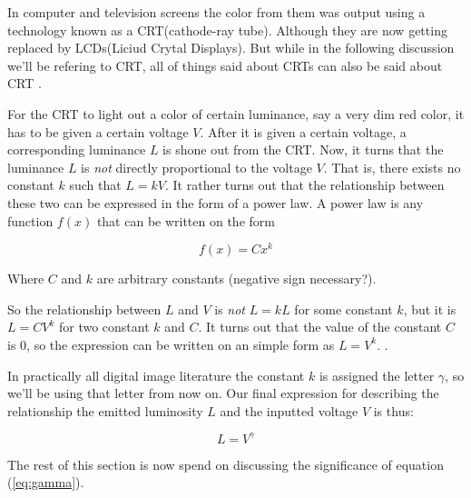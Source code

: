 \cite{lilley:_not_just_decor}

\cite{motta1991analytical_crt}

\cite{poynton2003digital}

In computer and television screens the color from them was output
using a technology known as a CRT(cathode-ray tube). Although they are
now getting replaced by LCDs(Liciud Crytal Displays). But while in the
following discussion we'll be refering to CRT, all of things said
about CRTs can also be said about CRT
\cite{hearn1997computer_graphics,roelofs99:_png}.

For the CRT to light out a color of certain luminance, say a very dim
red color, it has to be given a certain voltage $V$. After it is given
a certain voltage, a corresponding luminance $L$ is shone out from the
CRT. Now, it turns that the luminance $L$ is \textit{not} directly
proportional to the voltage $V$. That is, there exists no constant $k$
such that $L = kV$. It rather turns out that the relationship between
these two can be expressed in the form of a power law. A power law is
any function $f(x)$ that can be written on the form

\begin{equation*}
  f(x) = Cx^k
\end{equation*}

Where $C$ and $k$ are arbitrary constants (negative sign necessary?)\cite{newman05power,easley2010networks_powerlaw}.

So the relationship between $L$ and $V$ is \textit{not} $L = kL$ for
some constant $k$, but it is $L = CV^k$ for two constant $k$ and
$C$. It turns out that the value of the constant $C$ is $0$, so the
expression can be written on an simple form as $L =
V^k$. \cite{motta1991analytical_crt,Pascale2003_ReviewRGBColourSpaces,boutel:_png_portab_networ_graph_specif_version1,boutel:_png_portab_networ_graph_specif_version11,boutel:_png_portab_networ_graph_specif_version12,roelofs99:_png}.

In practically all digital image literature the constant $k$ is
assigned the letter $\gamma$, so we'll be using that letter from now
on. Our final expression for describing the relationship the emitted
luminosity $L$ and the inputted voltage $V$ is thus:

\begin{equation}
  \label{eq:gamma}
  L = V^\gamma
\end{equation}

The rest of this section is now spend on discussing the significance
of equation (\ref{eq:gamma}).

